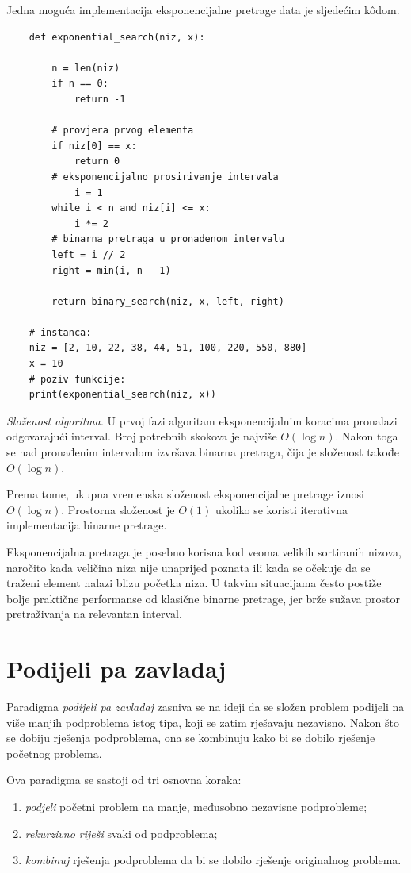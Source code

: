 Jedna moguća implementacija eksponencijalne pretrage data je sljedećim k\^odom.

\begin{verbatim}
	def exponential_search(niz, x):
	    
	    n = len(niz)
	    if n == 0:
	        return -1
	
	    # provjera prvog elementa
	    if niz[0] == x:
	        return 0
	    # eksponencijalno prosirivanje intervala
            i = 1
	    while i < n and niz[i] <= x:
	        i *= 2
	    # binarna pretraga u pronadenom intervalu
	    left = i // 2
	    right = min(i, n - 1)
	
	    return binary_search(niz, x, left, right)
	
	# instanca:
	niz = [2, 10, 22, 38, 44, 51, 100, 220, 550, 880]
	x = 10
	# poziv funkcije:
	print(exponential_search(niz, x))
\end{verbatim}

\textit{Složenost algoritma}. U prvoj fazi algoritam eksponencijalnim koracima pronalazi odgovarajući interval. Broj potrebnih skokova je najviše $O(\log n)$. Nakon toga se nad pronađenim intervalom izvršava binarna pretraga, čija je složenost takođe $O(\log n)$.

Prema tome, ukupna vremenska složenost eksponencijalne pretrage iznosi $O(\log n).$ Prostorna složenost je $O(1)$ ukoliko se koristi iterativna implementacija binarne pretrage.

Eksponencijalna pretraga je posebno korisna kod veoma velikih sortiranih nizova, naročito kada veličina niza nije unaprijed poznata ili kada se očekuje da se traženi element nalazi blizu početka niza. U takvim situacijama često postiže bolje praktične performanse od klasične binarne pretrage, jer brže sužava prostor pretraživanja na relevantan interval.


\section{Podijeli pa zavladaj}

Paradigma \textit{podijeli pa zavladaj} zasniva se na ideji da se složen problem podijeli na više manjih podproblema istog tipa, koji se zatim rješavaju nezavisno. Nakon što se dobiju rješenja podproblema, ona se kombinuju kako bi se dobilo rješenje početnog problema.

Ova paradigma se sastoji od tri osnovna koraka:

\begin{enumerate}
	\item \textit{podjeli} početni problem na manje, međusobno nezavisne podprobleme;
	\item \textit{rekurzivno riješi} svaki od podproblema;
	\item \textit{kombinuj} rješenja podproblema da bi se dobilo rješenje originalnog problema.
\end{enumerate}

